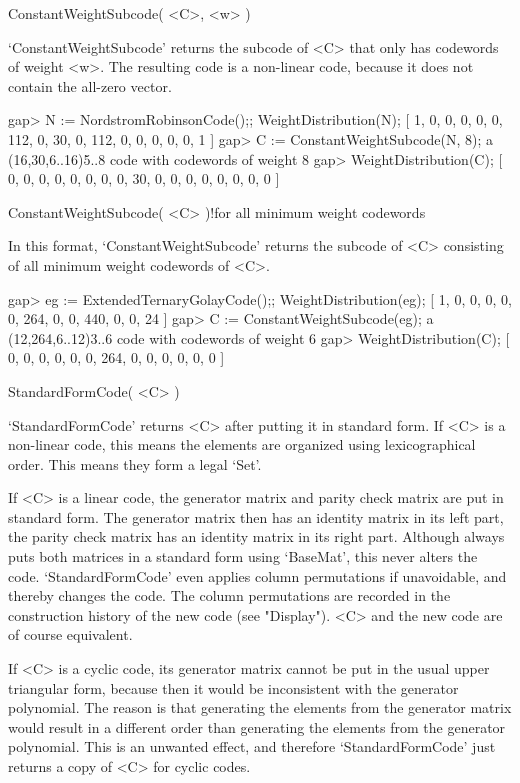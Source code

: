 \>ConstantWeightSubcode( <C>, <w> )

`ConstantWeightSubcode'   returns  the subcode  of   <C>   that only  has
codewords of weight <w>. The resulting code is a non-linear code, because
it does not contain the all-zero vector.

\beginexample
gap> N := NordstromRobinsonCode();; WeightDistribution(N);
[ 1, 0, 0, 0, 0, 0, 112, 0, 30, 0, 112, 0, 0, 0, 0, 0, 1 ]
gap> C := ConstantWeightSubcode(N, 8);
a (16,30,6..16)5..8 code with codewords of weight 8
gap> WeightDistribution(C);
[ 0, 0, 0, 0, 0, 0, 0, 0, 30, 0, 0, 0, 0, 0, 0, 0, 0 ] 
\endexample

\>ConstantWeightSubcode( <C> )!{for all minimum weight codewords}

In this   format, `ConstantWeightSubcode'  returns   the  subcode of  <C>
consisting of all minimum weight codewords of <C>.

\beginexample
gap> eg := ExtendedTernaryGolayCode();; WeightDistribution(eg);
[ 1, 0, 0, 0, 0, 0, 264, 0, 0, 440, 0, 0, 24 ]
gap> C := ConstantWeightSubcode(eg);
a (12,264,6..12)3..6 code with codewords of weight 6
gap> WeightDistribution(C);
[ 0, 0, 0, 0, 0, 0, 264, 0, 0, 0, 0, 0, 0 ] 
\endexample

\>StandardFormCode( <C> )

`StandardFormCode' returns <C> after putting it  in standard form. If <C>
is a  non-linear  code, this  means   the elements  are  organized  using
lexicographical order. This means they form a legal {\GAP} `Set'.

If <C> is a linear code, the generator matrix and parity check matrix are
put in standard form. The generator matrix then has an identity matrix in
its left  part, the  parity check  matrix has an  identity matrix  in its
right  part. Although {\GUAVA}  always puts both  matrices  in a standard
form using `BaseMat', this never alters the code. `StandardFormCode' even
applies column permutations  if   unavoidable, and thereby   changes  the
code. The column permutations are recorded in the construction history of
the  new  code (see  "Display").  <C> and  the   new code are  of  course
equivalent.

If <C> is a cyclic code, its generator matrix cannot be  put in the usual
upper   triangular form, because then  it  would be inconsistent with the
generator polynomial. The reason is that generating the elements from the
generator matrix  would result in a different  order than  generating the
elements from the generator polynomial.  This is an unwanted effect,  and
therefore `StandardFormCode' just returns a copy of <C> for cyclic codes.

